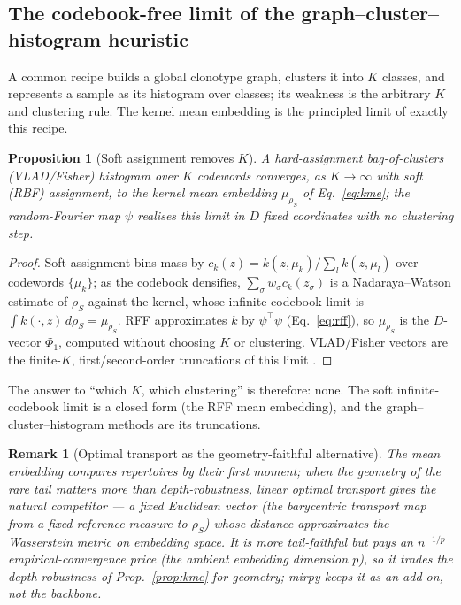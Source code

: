 \documentclass[11pt]{article}
\theoremstyle{oldplain}
\newtheorem{proposition}{Proposition}
\theoremstyle{oldrem}
\newtheorem{remark}{Remark}
\begin{document}
\subsection{The codebook-free limit of the graph--cluster--histogram heuristic}\label{sec:samp-codebook}

A common recipe builds a global clonotype graph, clusters it into $K$ classes, and represents a sample as its
histogram over classes; its weakness is the arbitrary $K$ and clustering rule. The kernel mean embedding is the
principled limit of exactly this recipe.

\begin{proposition}[Soft assignment removes $K$]\label{prop:codebook}
A hard-assignment bag-of-clusters ({\scshape VLAD}/Fisher) histogram over $K$ codewords converges, as
$K\to\infty$ with soft ({\scshape RBF}) assignment, to the kernel mean embedding $\mu_{\rho_S}$ of
Eq.~\eqref{eq:kme}; the random-Fourier map $\psi$ realises this limit in $D$ fixed coordinates with no clustering
step.
\end{proposition}
\begin{proof}
Soft assignment bins mass by $c_k(z)=k(z,\mu_k)/\sum_l k(z,\mu_l)$ over codewords $\{\mu_k\}$; as the codebook
densifies, $\sum_\sigma w_\sigma c_k(z_\sigma)$ is a Nadaraya--Watson estimate of $\rho_S$ against the kernel,
whose infinite-codebook limit is $\int k(\cdot,z)\,d\rho_S=\mu_{\rho_S}$. {\scshape RFF} approximates $k$ by
$\psi^\top\psi$ (Eq.~\eqref{eq:rff}), so $\mu_{\rho_S}$ is the $D$-vector $\Phi_1$, computed without choosing $K$
or clustering. {\scshape VLAD}/Fisher vectors are the finite-$K$, first/second-order truncations of this limit
\cite{Jegou2010,Perronnin2007}. \end{proof}

The answer to ``which $K$, which clustering'' is therefore: none. The soft infinite-codebook limit is a closed
form (the {\scshape RFF} mean embedding), and the graph--cluster--histogram methods are its truncations.

\begin{remark}[Optimal transport as the geometry-faithful alternative]\label{rem:samplot}
The mean embedding compares repertoires by their first moment; when the geometry of the rare tail matters more
than depth-robustness, \emph{linear optimal transport} \cite{Wang2013,Kolouri2021} gives the natural competitor
--- a fixed Euclidean vector (the barycentric transport map from a fixed reference measure to $\rho_S$) whose
distance approximates the Wasserstein metric on embedding space. It is more tail-faithful but pays an
$n^{-1/p}$ empirical-convergence price (the ambient embedding dimension $p$), so it trades the depth-robustness of Prop.~\ref{prop:kme} for geometry;
mirpy keeps it as an add-on, not the backbone.
\end{remark}
\end{document}
